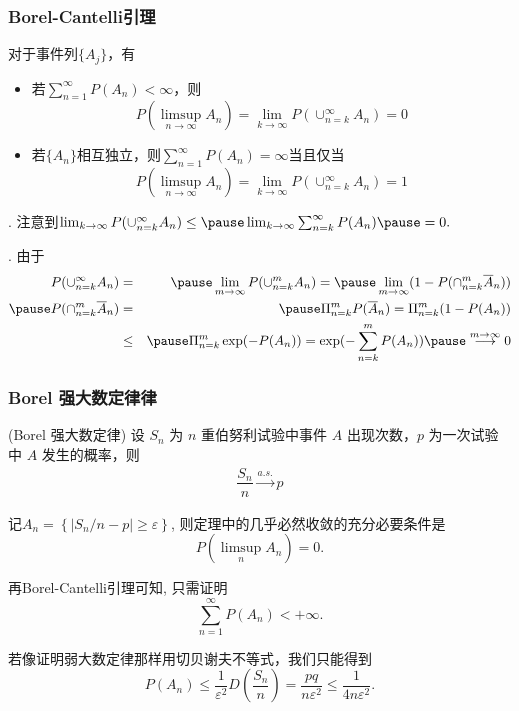 \begin{frame}
	\frametitle{Borel-Cantelli引理}
	\begin{thm}
	  对于事件列$\{A_j\}$，有
	  \begin{itemize}[<+-|alert@+>]
	  \item 若$\sum_{n=1}^\infty P(A_n)<\infty$，则
	  \[P(\limsup_{n\rightarrow\infty}A_n)=\lim_{k\rightarrow\infty}P(\cup_{n=k}^\infty A_n)=0\]
	  \item 若$\{A_n\}$相互独立，则$\sum_{n=1}^\infty P(A_n)=\infty$当且仅当
	  \[P(\limsup_{n\rightarrow\infty}A_n)=\lim_{k\rightarrow\infty}P(\cup_{n=k}^\infty A_n)=1\]
	  \end{itemize}
	\end{thm}\pause
	. 注意到$\lim_{k\rightarrow\infty}P(\cup_{n=k}^\infty A_n)\le \pause \lim_{k\rightarrow\infty}\sum_{n=k}^\infty P(A_n)\pause =0.$

	. 由于\pause
	\begin{eqnarray*}
	  P(\cup_{n=k}^\infty A_n)&=&\pause \lim_{m\rightarrow\infty}P(\cup_{n=k}^m A_n)=\pause \lim_{m\rightarrow\infty}(1-P(\cap_{n=k}^m\overline{A}_n))\\\pause
	  P(\cap_{n=k}^m\overline{A}_n)&=&\pause \Pi_{n=k}^m P(\overline{A}_n)=\Pi_{n=k}^m(1-P(A_n))\\
	  &\le&\pause \Pi_{n=k}^m \exp(-P(A_n))=\exp(-\sum_{n=k}^m P(A_n))\pause \stackrel{m\rightarrow\infty}{\longrightarrow} 0
	\end{eqnarray*}

  \end{frame}

\begin{frame}
	\frametitle{{\rm Borel} 强大数定律律}
	\begin{thm}({\rm Borel} 强大数定律)
		设 $S_n$ 为 $n$ 重伯努利试验中事件 $A$ 出现次数，$p$ 为一次试验中 $A$ 发生的概率，则
		\begin{eqnarray*}
			\dfrac{S_n}{n}\stackrel{a.s.}{\rightarrow} p
		\end{eqnarray*}
	\end{thm}

\pause

\fenxi 记${A_{n}=\left\{\left|S_n / n-p\right| \geq \varepsilon\right\}}$, 则定理中的几乎必然收敛的充分必要条件是\pause %
\[
P\left(\limsup_{n} A_{n}\right)=0.
\]

再Borel-Cantelli引理可知, 只需证明\pause
\[
\sum_{n=1}^{\infty} P\left(A_{n}\right)<+\infty.
\]

\pause
若像证明弱大数定律那样用切贝谢夫不等式，我们只能得到
\[
P\left(A_{n}\right) \leq \frac{1}{\varepsilon^{2}} D\left(\frac{S_n}{n}\right)=\frac{p q}{n \varepsilon^{2}} \leq \frac{1}{4 n \varepsilon^{2}} .
\]

\end{frame}

